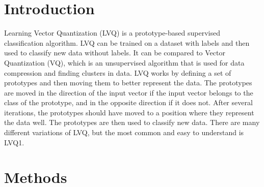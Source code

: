 \documentclass[twoside, a4paper, fleqn, reqno]{article}
\date{September 19, 2022}
\begin{document}
\maketitle

\section*{Introduction}
Learning Vector Quantization (LVQ) is a prototype-based supervised classification algorithm.
LVQ can be trained on a dataset with labels and then used to classify new data without labels.
It can be compared to Vector Quantization (VQ), which is an unsupervised algorithm
that is used for data compression and finding clusters in data. LVQ works by
defining a set of prototypes and then moving them to better represent the data.
The prototypes are moved in the direction of the input vector if the input vector
belongs to the class of the prototype, and in the opposite direction if it does not.
After several iterations, the prototypes should have moved to a position where
they represent the data well. The prototypes are then used to classify new data.
There are many different variations of LVQ, but the most common and easy to understand is LVQ1.

\section*{Methods}
\end{document}

